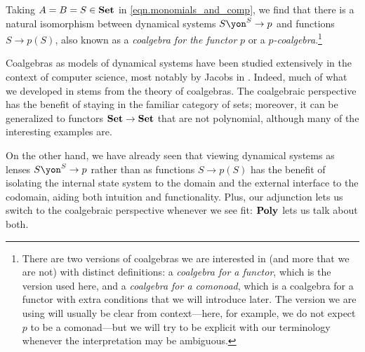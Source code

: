 \documentclass[Book-Poly]{subfiles}
\begin{document}

\begin{example}
Taking $A=B=S\in\mathbf{Set}$ in \eqref{eqn.monomials_and_comp}, we find that there is a natural isomorphism between dynamical systems $S\yon^S\to p$ and functions $S\to p(S)$, also known as a \emph{coalgebra for the functor} $p$ or a $p$\emph{-coalgebra}.\footnote{There are two versions of coalgebras we are interested in (and more that we are not) with distinct definitions: a \emph{coalgebra for a functor}, which is the version used here, and a \emph{coalgebra for a comonoad}, which is a coalgebra for a functor with extra conditions that we will introduce later.
The version we are using will usually be clear from context---here, for example, we do not expect $p$ to be a comonad---but we will try to be explicit with our terminology whenever the interpretation may be ambiguous.}

Coalgebras as models of dynamical systems have been studied extensively in the context of computer science, most notably by Jacobs in \cite{jacobs2017introduction}.
Indeed, much of what we developed in \label{sec.poly.dyn_sys.moore,sec.poly.dyn_sys.depend_sys} stems from the theory of coalgebras.
The coalgebraic perspective has the benefit of staying in the familiar category of sets; moreover, it can be generalized to functors $\mathbf{Set}\to\mathbf{Set}$ that are not polynomial, although many of the interesting examples are.

On the other hand, we have already seen that viewing dynamical systems as lenses $S\yon^S\to p$ rather than as functions $S\to p(S)$ has the benefit of isolating the internal state system to the domain and the external interface to the codomain, aiding both intuition and functionality.
Plus, our adjunction lets us switch to the coalgebraic perspective whenever we see fit: $\mathbf{Poly}$ lets us talk about both.
\end{example}
\end{document}
